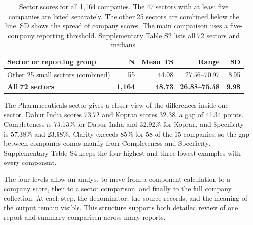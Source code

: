\begin{table}[p]
\centering
\begingroup
\footnotesize
\setlength{\tabcolsep}{5pt}
\renewcommand{\arraystretch}{1.00}
\caption{Sector scores for all 1,164 companies. The 47 sectors with at least five companies are listed separately. The other 25 sectors are combined below the line. SD shows the spread of company scores. The main comparison uses a five-company reporting threshold. Supplementary Table S2 lists all 72 sectors and medians.}
\label{tab:all_sectors}
\begin{tabularx}{\linewidth}{@{}Yrrrr@{}}
\toprule\textbf{Sector or reporting group} & \textbf{N} & \textbf{Mean TS} & \textbf{Range} & \textbf{SD}\\\midrule
\midrule
Other 25 small sectors (combined) & 55 & 44.08 & 27.56--70.97 & 8.95\\
\textbf{All 72 sectors} & \textbf{1,164} & \textbf{48.73} & \textbf{26.88--75.58} & \textbf{9.98}\\\bottomrule
\end{tabularx}
\endgroup
\end{table}

The Pharmaceuticals sector gives a closer view of the differences inside one sector. Dabur India scores 73.72 and Kopran scores 32.38, a gap of 41.34 points. Completeness is 73.13\% for Dabur India and 32.92\% for Kopran, and Specificity is 57.38\% and 23.68\%. Clarity exceeds 85\% for 58 of the 65 companies, so the gap between companies comes mainly from Completeness and Specificity. Supplementary Table S4 keeps the four highest and three lowest examples with every component.

The four levels allow an analyst to move from a component calculation to a company score, then to a sector comparison, and finally to the full company collection. At each step, the denominator, the source records, and the meaning of the output remain visible. This structure supports both detailed review of one report and summary comparison across many reports.

\FloatBarrier
